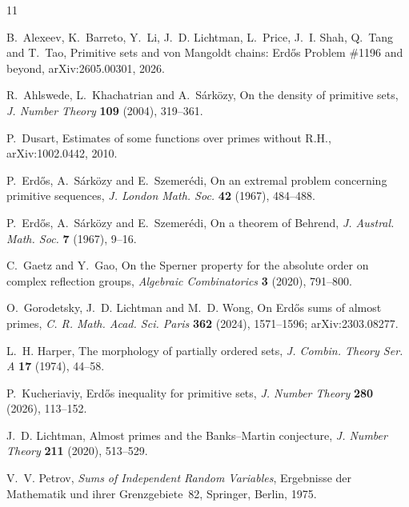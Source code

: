 \documentclass[11pt,a4paper]{article}
\numberwithin{equation}{section}
\theoremstyle{plain}
\theoremstyle{definition}
\theoremstyle{remark}
\begin{document}
\begin{thebibliography}{11}

B.~Alexeev, K.~Barreto, Y.~Li, J.~D. Lichtman, L.~Price, J.~I. Shah, Q.~Tang and T.~Tao, Primitive sets and von Mangoldt chains: Erd\H{o}s Problem \#1196 and beyond, arXiv:2605.00301, 2026.

R.~Ahlswede, L.~Khachatrian and A.~S\'ark\"ozy, On the density of primitive sets, \emph{J. Number Theory} \textbf{109} (2004), 319--361.

P.~Dusart, Estimates of some functions over primes without R.H., arXiv:1002.0442, 2010.

P.~Erd\H{o}s, A.~S\'ark\"ozy and E.~Szemer\'edi, On an extremal problem concerning primitive sequences, \emph{J. London Math. Soc.} \textbf{42} (1967), 484--488.

P.~Erd\H{o}s, A.~S\'ark\"ozy and E.~Szemer\'edi, On a theorem of Behrend, \emph{J. Austral. Math. Soc.} \textbf{7} (1967), 9--16.

C.~Gaetz and Y.~Gao, On the Sperner property for the absolute order on complex reflection groups, \emph{Algebraic Combinatorics} \textbf{3} (2020), 791--800.

O.~Gorodetsky, J.~D. Lichtman and M.~D. Wong, On Erd\H{o}s sums of almost primes, \emph{C. R. Math. Acad. Sci. Paris} \textbf{362} (2024), 1571--1596; arXiv:2303.08277.

L.~H. Harper, The morphology of partially ordered sets, \emph{J. Combin. Theory Ser. A} \textbf{17} (1974), 44--58.

P.~Kucheriaviy, Erd\H{o}s inequality for primitive sets, \emph{J. Number Theory} \textbf{280} (2026), 113--152.

J.~D. Lichtman, Almost primes and the Banks--Martin conjecture, \emph{J. Number Theory} \textbf{211} (2020), 513--529.

V.~V. Petrov, \emph{Sums of Independent Random Variables}, Ergebnisse der Mathematik und ihrer Grenzgebiete~82, Springer, Berlin, 1975.

\end{thebibliography}
\end{document}
